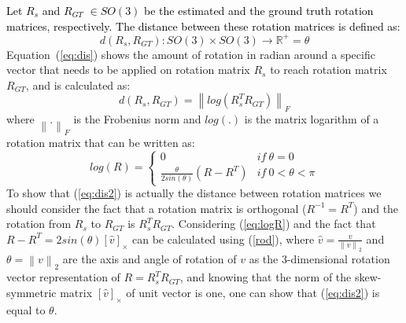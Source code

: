 \documentclass[journal,transmag]{IEEEtran}
\begin{document}
\textcolor{black}{Let $R_{s}$ and $R_{GT}$ $\in SO(3)$ be the estimated and the ground truth rotation matrices, respectively. The distance between these rotation matrices is defined as:}
\begin{equation}
    d(R_s, R_{GT}):SO(3)\times SO(3) \rightarrow \mathbb{R}^{+} = \theta
    \label{eq:dis}
\end{equation}
Equation~(\ref{eq:dis}) shows the amount of rotation in radian around a specific vector that needs to be applied on rotation matrix $R_s$ to reach rotation matrix $R_{GT}$, and is calculated as:
\begin{equation}
    d(R_s, R_{GT}) = \left \| log(R_s^TR_{GT}) \right \|_F
    \label{eq:dis2}
\end{equation}
where $\left \| . \right \|_F $ is the Frobenius norm and $log(.)$ is the matrix logarithm of a rotation matrix that can be written as:
\begin{equation}
    log(R) = \left\{\begin{matrix}
0 & if \ \theta=0\\ 
\frac{\theta}{2sin(\theta)} (R-R^T)& if \ 0< \theta<\pi 
\end{matrix}\right. 
    \label{eq:logR}
\end{equation}
To show that (\ref{eq:dis2}) is actually the distance between rotation matrices we should consider the fact that a rotation matrix is orthogonal ($R^{-1}=R^T$) and the rotation from $R_s$ to $R_{GT}$ is $R_s^TR_{GT}$. Considering (\ref{eq:logR}) and the fact that $R-R^T = 2sin(\theta)[\hat{v}]_\times$ can be calculated using (\ref{rod}), where $\hat{v} = \frac{v}{\left \| v \right \|_2}$ and $\theta = {\left \| v \right \|_2}$ are the axis and angle of rotation of $v$ as the 3-dimensional rotation vector representation of $R = R_s^TR_{GT}$, and knowing that the norm of the skew-symmetric matrix $[\hat{v}]_\times$ of unit vector is one, one can show that (\ref{eq:dis2}) is equal to $\theta$.
\end{document}
